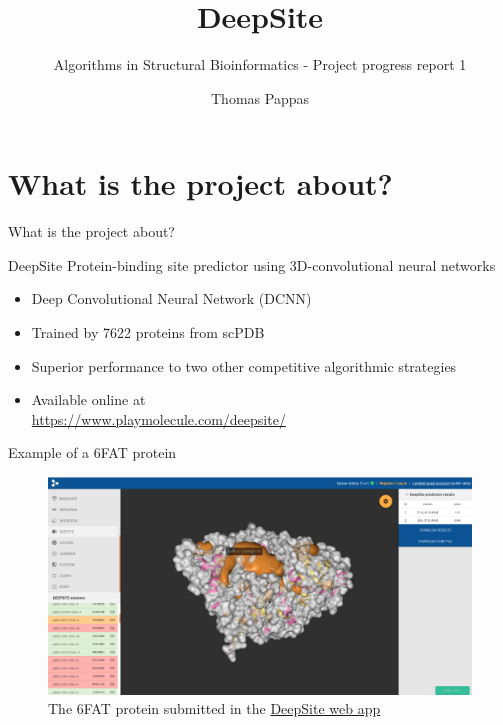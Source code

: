 \documentclass{beamer}
\begin{document}
\title{DeepSite}
\subtitle{Algorithms in Structural Bioinformatics - Project progress report 1}
\author{Thomas Pappas}
\maketitle

\section{What is the project about?}

\begin{frame}{What is the project about?}
  \begin{block}{DeepSite}
    Protein-binding site predictor using 3D-convolutional neural networks
    \begin{itemize}
      \item Deep Convolutional Neural Network (DCNN)
      \item Trained by 7622 proteins from scPDB
      \item Superior performance to two other competitive algorithmic strategies
      \item Available online at\\ \url{https://www.playmolecule.com/deepsite/}
  \end{itemize}
  \end{block}
\end{frame}

\begin{frame}{Example of a 6FAT protein}
  \begin{figure}[h]
    \includegraphics[width=1\textwidth]{deepsite_6fat_result}
    \caption{The 6FAT protein submitted in the \href{https://www.playmolecule.com/deepsite/}{DeepSite web app}}
  \end{figure}
\end{frame}
\end{document}
